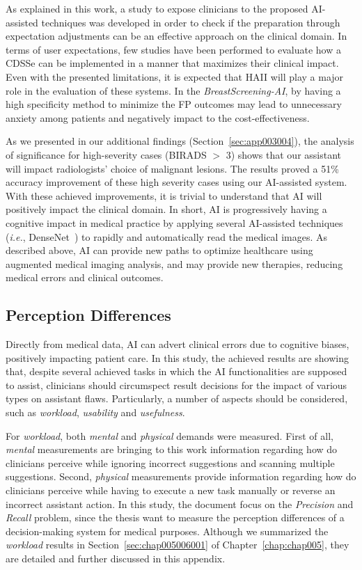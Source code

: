As explained in this work, a study to expose clinicians to the proposed \ac{AI}-assisted techniques was developed in order to check if the preparation through expectation adjustments can be an effective approach on the clinical domain.
In terms of user expectations, few studies have been performed to evaluate how a \ac{CDSSe} can be implemented in a manner that maximizes their clinical impact.
Even with the presented limitations, it is expected that \ac{HAII} will play a major role in the evaluation of these systems.
In the {\it BreastScreening-AI}, by having a high specificity method to minimize the \ac{FP} outcomes may lead to unnecessary anxiety among patients and negatively impact to the cost-effectiveness.

As we presented in our additional findings (Section~\ref{sec:app003004}), the analysis of significance for high-severity cases (BIRADS $>$ 3) shows that our assistant will impact radiologists' choice of malignant lesions.
The results proved a 51\% accuracy improvement of these high severity cases using our \ac{AI}-assisted system.
With these achieved improvements, it is trivial to understand that \ac{AI} will positively impact the clinical domain.
In short, \ac{AI} is progressively having a cognitive impact in medical practice by applying several AI-assisted techniques ({\it i.e.}, DenseNet~\cite{GOTTAPU2018179}) to rapidly and automatically read the medical images.
As described above, \ac{AI} can provide new paths to optimize healthcare using augmented medical imaging analysis, and may provide new therapies, reducing medical errors and clinical outcomes.

\subsection{Perception Differences}
\label{sec:app003005002}

Directly from medical data, \ac{AI} can advert clinical errors due to cognitive biases, positively impacting patient care.
In this study, the achieved results are showing that, despite several achieved tasks in which the \ac{AI} functionalities are supposed to assist, clinicians should circumspect result decisions for the impact of various types on assistant flaws.
Particularly, a number of aspects should be considered, such as {\it workload}, {\it usability} and {\it usefulness}.

For {\it workload}, both {\it mental} and {\it physical} demands were measured.
First of all, {\it mental} measurements are bringing to this work information regarding how do clinicians perceive while ignoring incorrect suggestions and scanning multiple suggestions.
Second, {\it physical} measurements provide information regarding how do clinicians perceive while having to execute a new task manually or reverse an incorrect assistant action.
In this study, the document focus on the {\it Precision} and {\it Recall} problem, since the thesis want to measure the perception differences of a decision-making system for medical purposes.
Although we summarized the {\it workload} results in Section~\ref{sec:chap005006001} of Chapter~\ref{chap:chap005}, they are detailed and further discussed in this appendix.

